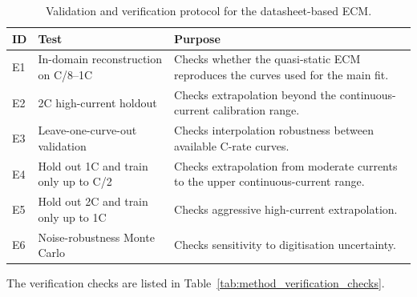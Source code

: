 \documentclass[a4paper,12pt]{article}
\begin{document}
\begin{table}[H]
\centering
\caption{Validation and verification protocol for the datasheet-based ECM.}
\label{tab:method_validation_protocol_map}
\begin{tabularx}{0.98\textwidth}{@{}L{0.12\textwidth}L{0.32\textwidth}Y@{}}
\toprule
\textbf{ID} &
\textbf{Test} &
\textbf{Purpose} \\
\midrule
E1 &
In-domain reconstruction on C/8--1C &
Checks whether the quasi-static ECM reproduces the curves used for the main fit. \\
E2 &
2C high-current holdout &
Checks extrapolation beyond the continuous-current calibration range. \\
E3 &
Leave-one-curve-out validation &
Checks interpolation robustness between available C-rate curves. \\
E4 &
Hold out 1C and train only up to C/2 &
Checks extrapolation from moderate currents to the upper continuous-current range. \\
E5 &
Hold out 2C and train only up to 1C &
Checks aggressive high-current extrapolation. \\
E6 &
Noise-robustness Monte Carlo &
Checks sensitivity to digitisation uncertainty. \\
\bottomrule
\end{tabularx}
\end{table}

The verification checks are listed in Table~\ref{tab:method_verification_checks}.
\end{document}

